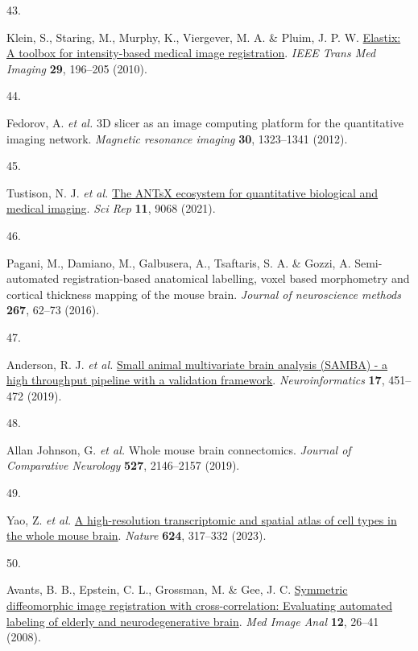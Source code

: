 \documentclass[
  12pt,
]{article}
\newlength{\cslhangindent}
\newlength{\csllabelwidth}
\newenvironment{CSLReferences}[2] %
 {\begin{list}{}{%
  \setlength{\itemindent}{0pt}
  \setlength{\leftmargin}{0pt}
  \setlength{\parsep}{0pt}
  \ifodd #1
   \setlength{\leftmargin}{\cslhangindent}
   \setlength{\itemindent}{-1\cslhangindent}
  \fi
  \setlength{\itemsep}{#2\baselineskip}}}
 {\end{list}}
\newcommand{\CSLLeftMargin}[1]{\parbox[t]{\csllabelwidth}{\strut#1\strut}}
\newcommand{\CSLRightInline}[1]{\parbox[t]{\linewidth - \csllabelwidth}{\strut#1\strut}}
\begin{document}
\begin{CSLReferences}{0}{0}
\CSLLeftMargin{43. }%
\CSLRightInline{Klein, S., Staring, M., Murphy, K., Viergever, M. A. \&
Pluim, J. P. W. \href{https://doi.org/10.1109/TMI.2009.2035616}{Elastix:
A toolbox for intensity-based medical image registration}. \emph{IEEE
Trans Med Imaging} \textbf{29}, 196--205 (2010).}

\CSLLeftMargin{44. }%
\CSLRightInline{Fedorov, A. \emph{et al.} 3D slicer as an image
computing platform for the quantitative imaging network. \emph{Magnetic
resonance imaging} \textbf{30}, 1323--1341 (2012).}

\CSLLeftMargin{45. }%
\CSLRightInline{Tustison, N. J. \emph{et al.}
\href{https://doi.org/10.1038/s41598-021-87564-6}{The ANTsX ecosystem
for quantitative biological and medical imaging}. \emph{Sci Rep}
\textbf{11}, 9068 (2021).}

\CSLLeftMargin{46. }%
\CSLRightInline{Pagani, M., Damiano, M., Galbusera, A., Tsaftaris, S. A.
\& Gozzi, A. Semi-automated registration-based anatomical labelling,
voxel based morphometry and cortical thickness mapping of the mouse
brain. \emph{Journal of neuroscience methods} \textbf{267}, 62--73
(2016).}

\CSLLeftMargin{47. }%
\CSLRightInline{Anderson, R. J. \emph{et al.}
\href{https://doi.org/10.1007/s12021-018-9410-0}{Small animal
multivariate brain analysis (SAMBA) - a high throughput pipeline with a
validation framework}. \emph{Neuroinformatics} \textbf{17}, 451--472
(2019).}

\CSLLeftMargin{48. }%
\CSLRightInline{Allan Johnson, G. \emph{et al.} Whole mouse brain
connectomics. \emph{Journal of Comparative Neurology} \textbf{527},
2146--2157 (2019).}

\CSLLeftMargin{49. }%
\CSLRightInline{Yao, Z. \emph{et al.}
\href{https://doi.org/10.1038/s41586-023-06812-z}{A high-resolution
transcriptomic and spatial atlas of cell types in the whole mouse
brain}. \emph{Nature} \textbf{624}, 317--332 (2023).}

\CSLLeftMargin{50. }%
\CSLRightInline{Avants, B. B., Epstein, C. L., Grossman, M. \& Gee, J.
C. \href{https://doi.org/10.1016/j.media.2007.06.004}{Symmetric
diffeomorphic image registration with cross-correlation: Evaluating
automated labeling of elderly and neurodegenerative brain}. \emph{Med
Image Anal} \textbf{12}, 26--41 (2008).}


\end{CSLReferences}
\end{document}
